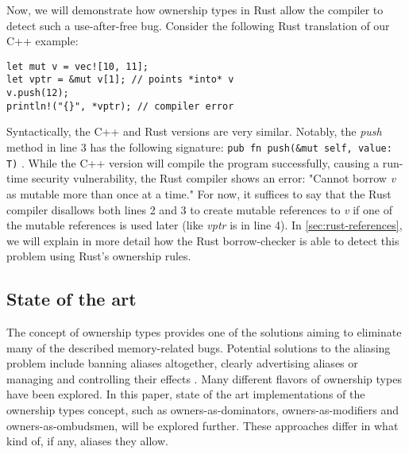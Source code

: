 \documentclass[sigplan,11pt,nonacm]{acmart}
\begin{document}

Now, we will demonstrate how ownership types in Rust allow the compiler to detect such a use-after-free bug.
Consider the following Rust translation of our C++ example:

\begin{lstlisting}
let mut v = vec![10, 11];
let vptr = &mut v[1]; // points *into* v
v.push(12);
println!("{}", *vptr); // compiler error
\end{lstlisting}

Syntactically, the C++ and Rust versions are very similar.
Notably, the \emph{push} method in line 3 has the following signature: \verb|pub fn push(&mut self, value: T)| \cite{rust-vector-documentation}.
While the C++ version will compile the program successfully, causing a run-time security vulnerability, the Rust compiler shows an error: "Cannot borrow \emph{v} as mutable more than once at a time."
For now, it suffices to say that the Rust compiler disallows both lines 2 and 3 to create mutable references to \emph{v} if one of the mutable references is used later (like \emph{vptr} is in line 4).
In \ref{sec:rust-references}, we will explain in more detail how the Rust borrow-checker is able to detect this problem using Rust's ownership rules.



\subsection{State of the art}
\label{sec:state-of-the-art}


The concept of ownership types provides one of the solutions aiming to eliminate many of the described memory-related bugs.
Potential solutions to the aliasing problem include banning aliases altogether, clearly advertising aliases or managing and controlling their effects \cite{ownership-types-survey}.
Many different flavors of ownership types have been explored.
In this paper, state of the art implementations of the ownership types concept, such as owners-as-dominators, owners-as-modifiers and owners-as-ombudsmen, will be explored further.
These approaches differ in what kind of, if any, aliases they allow.
\end{document}
